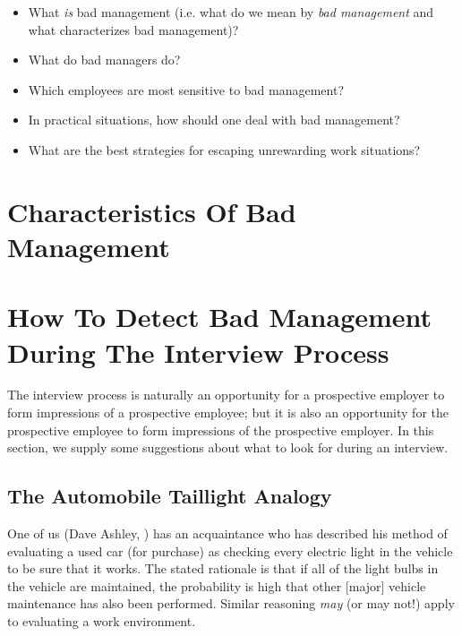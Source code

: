\begin{itemize}
\item What \emph{is} bad management (i.e. what do we mean by
      \emph{bad management}
	  and what characterizes bad management)?

\item What do bad managers do?

\item Which employees are most sensitive to bad management?

\item In practical situations, how should one deal with bad
      management?

\item What are the best strategies for escaping unrewarding
      work situations?
\end{itemize}


\section{Characteristics Of Bad Management}





\section{How To Detect Bad Management During The Interview Process}

The interview process is naturally an opportunity for a prospective
employer to form impressions of a prospective employee; but it is
also an opportunity for the prospective employee to form impressions
of the prospective employer.  In this section, we supply some suggestions
about what to look for during an interview.

\subsection{The Automobile Taillight Analogy}

One of us (Dave Ashley, \cite{bibref:i:daveashley})
has an acquaintance who has described his method of evaluating
a used car (for purchase) as checking every electric light in the
vehicle to be sure that it works.  The stated rationale is that if
all of the light bulbs in the vehicle are maintained, the probability
is high that other [major] vehicle maintenance has also been performed.
Similar reasoning \emph{may} (or may not!) apply to evaluating
a work environment.

